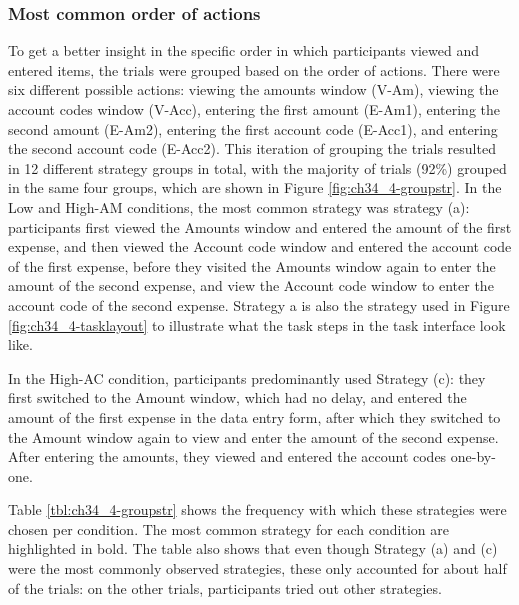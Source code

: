 \subsubsection{Most common order of actions}\label{sec:ch34-StrategyFreq}
To get a better insight in the specific order in which participants viewed and entered items, the trials were grouped based on the order of actions. There were six different possible actions: viewing the amounts window (V-Am), viewing the account codes window (V-Acc), entering the first amount (E-Am1), entering the second amount (E-Am2), entering the first account code (E-Acc1), and entering the second account code (E-Acc2). This iteration of grouping the trials resulted in 12 different strategy groups in total, with the majority of trials (92\%) grouped in the same four groups, which are shown in Figure \ref{fig:ch34_4-groupstr}. In the Low and High-AM conditions, the most common strategy was strategy (a): participants first viewed the Amounts window and entered the amount of the first expense, and then viewed the Account code window and entered the account code of the first expense, before they visited the Amounts window again to enter the amount of the second expense, and view the Account code window to enter the account code of the second expense. Strategy a is also the strategy used in Figure \ref{fig:ch34_4-tasklayout} to illustrate what the task steps in the task interface look like.

In the High-AC condition, participants predominantly used Strategy (c): they first switched to the Amount window, which had no delay, and entered the amount of the first expense in the data entry form, after which they switched to the Amount window again to view and enter the amount of the second expense. After entering the amounts, they viewed and entered the account codes one-by-one.

Table \ref{tbl:ch34_4-groupstr} shows the frequency with which these strategies were chosen per condition. The most common strategy for each condition are highlighted in bold. The table also shows that even though Strategy (a) and (c) were the most commonly observed strategies, these only accounted for about half of the trials: on the other  trials, participants tried out other strategies.  


